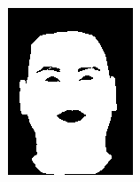 \begin{figure}[h]
\begin{subfigure}[b]{0.18\textwidth}
         \includegraphics[width=\textwidth]{images/results/base_st/dd121.color.d3_y.png}
     \end{subfigure}
    \hfill
     \begin{subfigure}[b]{0.18\textwidth}
         \centering

\end{subfigure}
\end{figure}
